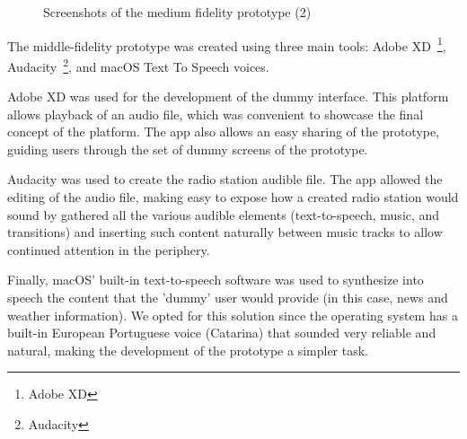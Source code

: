 {{\begin{figure}[htbp]
		 \qquad
	\caption{Screenshots of the medium fidelity prototype (2)}
	\label{fig:mfp2}
\end{figure}



The middle-fidelity prototype was created using three main tools: Adobe XD~\footnote{Adobe XD}, Audacity~\footnote{Audacity}, and macOS Text To Speech voices. 

Adobe XD was used for the development of the dummy interface. This platform allows playback of an audio file, which was convenient to showcase the final concept of the platform. The app also allows an easy sharing of the prototype, guiding users through the set of dummy screens of the prototype. 

Audacity was used to create the radio station audible file. The app allowed the editing of the audio file, making easy to expose how a created radio station would sound by gathered all the various audible elements (text-to-speech, music, and transitions) and inserting such content naturally between music tracks to allow continued attention in the periphery.

Finally, macOS' built-in text-to-speech software was used to synthesize into speech the content that the 'dummy' user would provide (in this case, news and weather information). We opted for this solution since the operating system has a built-in European Portuguese voice (Catarina) that sounded very reliable and natural, making the development of the prototype a simpler task.

}}
